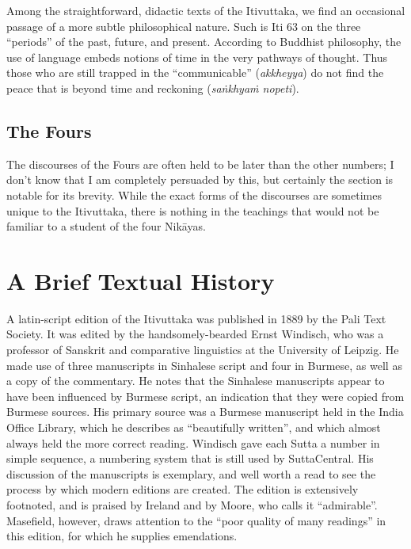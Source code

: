 \documentclass[12pt,openany]{book}%
\begin{document}
Among the straightforward, didactic texts of the Itivuttaka, we find an occasional passage of a more subtle philosophical nature. Such is Iti 63 on the three “periods” of the past, future, and present. According to Buddhist philosophy, the use of language embeds notions of time in the very pathways of thought. Thus those who are still trapped in the “communicable” (\emph{akkheyya}) do not find the peace that is beyond time and reckoning (\emph{\textsanskrit{saṅkhyaṁ} nopeti}).

\subsection*{The Fours}

The discourses of the Fours are often held to be later than the other numbers; I don’t know that I am completely persuaded by this, but certainly the section is notable for its brevity. While the exact forms of the discourses are sometimes unique to the Itivuttaka, there is nothing in the teachings that would not be familiar to a student of the four \textsanskrit{Nikāyas}.

\section*{A Brief Textual History}

A latin-script edition of the Itivuttaka was published in 1889 by the Pali Text Society. It was edited by the handsomely-bearded Ernst Windisch, who was a professor of Sanskrit and comparative linguistics at the University of Leipzig. He made use of three manuscripts in Sinhalese script and four in Burmese, as well as a copy of the commentary. He notes that the Sinhalese manuscripts appear to have been influenced by Burmese script, an indication that they were copied from Burmese sources. His primary source was a Burmese manuscript held in the India Office Library, which he describes as “beautifully written”, and which almost always held the more correct reading. Windisch gave each Sutta a number in simple sequence, a numbering system that is still used by SuttaCentral. His discussion of the manuscripts is exemplary, and well worth a read to see the process by which modern editions are created. The edition is extensively footnoted, and is praised by Ireland and by Moore, who calls it “admirable”. Masefield, however, draws attention to the “poor quality of many readings” in this edition, for which he supplies emendations.
\end{document}
